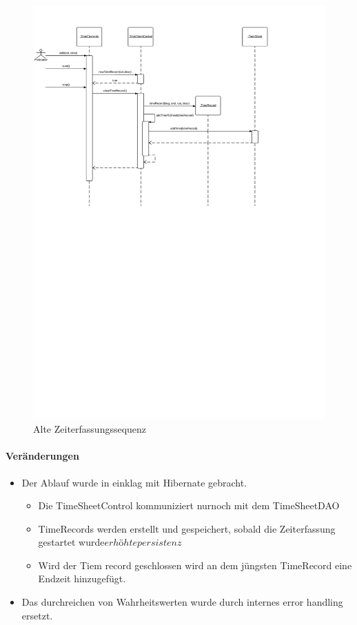     \begin{figure}
      \centering
        \includegraphics[width=\linewidth]{new-Time-record.svg}
       \caption{Alte Zeiterfassungssequenz}
    \end{figure}

    \paragraph{Veränderungen}
    \begin{itemize}
        \item Der Ablauf wurde in einklag mit Hibernate gebracht.
        \begin{itemize}
            \item Die TimeSheetControl kommuniziert nurnoch mit dem TimeSheetDAO
            \item TimeRecords werden erstellt und gespeichert, sobald die Zeiterfassung gestartet wurde\(erhöhte persistenz\)
            \item Wird der Tiem record geschlossen wird an dem jüngsten TimeRecord eine Endzeit hinzugefügt.
        \end{itemize}
        \item Das durchreichen von Wahrheitswerten wurde durch internes error handling ersetzt.
    \end{itemize}

